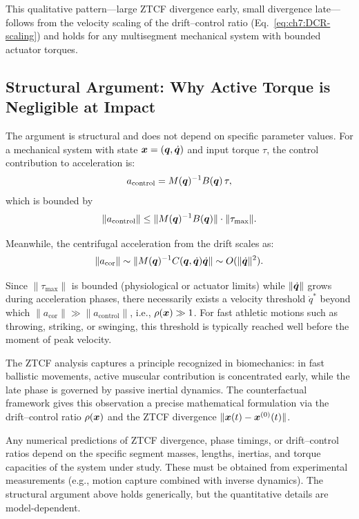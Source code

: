This qualitative pattern---large ZTCF divergence early, small divergence late---follows
from the velocity scaling of the drift--control ratio (Eq.~\ref{eq:ch7:DCR-scaling})
and holds for any multisegment mechanical system with bounded actuator torques.

\subsection{Structural Argument: Why Active Torque is Negligible at Impact}

The argument is structural and does not depend on specific parameter values.
For a mechanical system with state $\bm{x} = (\bm{q}, \dot{\bm{q}})$ and input torque $\tau$,
the control contribution to acceleration is:
\begin{equation}
a_{\text{control}} = M(\bm{q})^{-1} B(\bm{q})\,\tau,
\end{equation}
which is bounded by
\begin{equation}
\|a_{\text{control}}\| \leq \|M(\bm{q})^{-1} B(\bm{q})\| \cdot \|\tau_{\max}\|.
\end{equation}

Meanwhile, the centrifugal acceleration from the drift scales as:
\begin{equation}
\|a_{\text{cor}}\| \sim \|M(\bm{q})^{-1} C(\bm{q},\dot{\bm{q}})\dot{\bm{q}}\| \sim O(\|\dot{\bm{q}}\|^2).
\end{equation}

Since $\|\tau_{\max}\|$ is bounded (physiological or actuator limits) while
$\|\dot{\bm{q}}\|$ grows during acceleration phases, there necessarily exists a velocity
threshold $\dot{q}^*$ beyond which $\|a_{\text{cor}}\| \gg \|a_{\text{control}}\|$,
i.e., $\rho(\bm{x}) \gg 1$. For fast athletic motions such as throwing, striking, or
swinging, this threshold is typically reached well before the moment of peak velocity.

\begin{intuitionbox}
The ZTCF analysis captures a principle recognized in biomechanics: in fast
ballistic movements, active muscular contribution is concentrated early, while the
late phase is governed by passive inertial dynamics. The counterfactual framework
gives this observation a precise mathematical formulation via the drift--control ratio
$\rho(\bm{x})$ and the ZTCF divergence $\|\bm{x}(t) - \bm{x}^{(0)}(t)\|$.
\end{intuitionbox}

\begin{warningbox}
Any numerical predictions of ZTCF divergence, phase timings, or drift--control
ratios depend on the specific segment masses, lengths, inertias, and torque
capacities of the system under study. These must be obtained from experimental
measurements (e.g., motion capture combined with inverse dynamics). The structural
argument above holds generically, but the quantitative details are model-dependent.
\end{warningbox}


